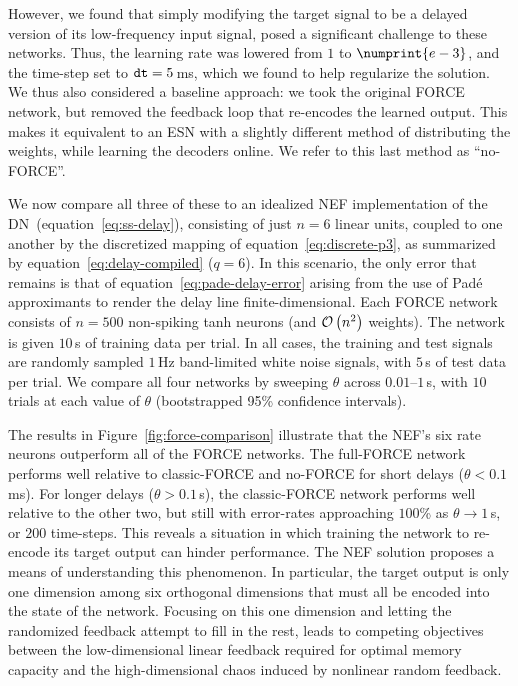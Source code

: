 However, we found that simply modifying the target signal to be a delayed version of its low-frequency input signal, posed a significant challenge to these networks.
Thus, the learning rate was lowered from $1$ to $\numprint{e-3}$, and the time-step set to $\texttt{dt}{} = 5$\,ms, which we found to help regularize the solution.
We thus also considered a baseline approach:
we took the original FORCE network, but removed the feedback loop that re-encodes the learned output.
This makes it equivalent to an ESN with a slightly different method of distributing the weights, while learning the decoders online.
We refer to this last method as ``no-FORCE''.

We now compare all three of these to an idealized NEF implementation of the DN~(equation~\ref{eq:ss-delay}), consisting of just $n = 6$ linear units, coupled to one another by the discretized mapping of equation~\ref{eq:discrete-p3}, as summarized by equation~\ref{eq:delay-compiled} ($q = 6$).
In this scenario, the only error that remains is that of equation~\ref{eq:pade-delay-error} arising from the use of Pad\'e approximants to render the delay line finite-dimensional.
Each FORCE network consists of $n = 500$ non-spiking tanh neurons (and $\mathcal{O}\left({n^2}\right)$ weights).
The network is given $10$\,s of training data per trial.
In all cases, the training and test signals are randomly sampled $1$\,Hz band-limited white noise signals, with $5$\,s of test data per trial.
We compare all four networks by sweeping $\theta$ across $0.01$--$1$\,s, with $10$ trials at each value of $\theta$ (bootstrapped 95\% confidence intervals).


The results in Figure~\ref{fig:force-comparison} illustrate that the NEF's six rate neurons outperform all of the FORCE networks.
The full-FORCE network performs well relative to classic-FORCE and no-FORCE for short delays ($\theta < 0.1$\,ms).
For longer delays ($\theta > 0.1$\,s), the classic-FORCE network performs well relative to the other two, but still with error-rates approaching $100$\% as $\theta \rightarrow 1$\,s, or $200$ time-steps.
This reveals a situation in which training the network to re-encode its target output can hinder performance.
The NEF solution proposes a means of understanding this phenomenon.
In particular, the target output is only one dimension among six orthogonal dimensions that must all be encoded into the state of the network.
Focusing on this one dimension and letting the randomized feedback attempt to fill in the rest, leads to competing objectives between the low-dimensional linear feedback required for optimal memory capacity and the high-dimensional chaos induced by nonlinear random feedback.

